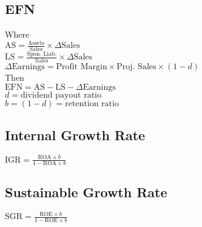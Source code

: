 \subsection*{EFN}
Where \\
$\mathrm{AS} = \frac{\mathrm{Assets}}{\mathrm{Sales}}\times\Delta\mathrm{Sales}$ \\
$\mathrm{LS} = \frac{\text{Spon. Liab.}}{\mathrm{Sales}}\times\Delta\mathrm{Sales}$ \\
$\Delta\mathrm{Earnings} = \text{Profit Margin}\times\text{Proj. Sales}\times\left(1 - d\right)$ \\
Then \\
$\mathrm{EFN} = \mathrm{AS} - \mathrm{LS} - \Delta\mathrm{Earnings}$ \\
$d = \text{dividend payout ratio}$ \\
$b = (1 - d) = \text{retention ratio}$ \\

\subsection*{Internal Growth Rate}
$\mathrm{IGR} = \frac{\mathrm{ROA}\times b}{1-\mathrm{ROA}\times b}$
\subsection*{Sustainable Growth Rate}
$\mathrm{SGR} = \frac{\mathrm{ROE}\times b}{1-\mathrm{ROE}\times b}$ \\
